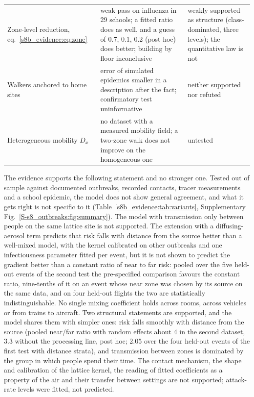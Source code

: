 \begin{table}[tbp]
\begin{tabular}{@{}>{\raggedright\arraybackslash}p{}>{\raggedright\arraybackslash}p{}>{\raggedright\arraybackslash}p{}@{}}
    Zone-level reduction, eq.~\eqref{s8b_evidence:eq:zone} &
      weak pass on influenza in 29 schools; a fitted ratio does as well, and a guess of 0.7, 0.1, 0.2 (post hoc)
      does better; building by floor inconclusive &
      weakly supported as structure (class-dominated, three levels); the quantitative law is not \\\addlinespace[2pt]
    Walkers anchored to home sites &
      error of simulated epidemics smaller in a description after the fact; confirmatory test uninformative &
      neither supported nor refuted \\\addlinespace[2pt]
    Heterogeneous mobility $D_x$ &
      no dataset with a measured mobility field; a two-zone walk does not improve on the homogeneous one &
      untested \\
    \bottomrule
  \end{tabular}
\end{table}

The evidence supports the following statement and no stronger one. Tested out of sample against documented
outbreaks, recorded contacts, tracer measurements and a school epidemic, the model does not show general
agreement, and what it gets right is not specific to it (Table~\ref{s8b_evidence:tab:variants},
Supplementary Fig.~\ref{S-s8_outbreaks:fig:summary}). The model with transmission only between people on the same lattice site is
not supported. The extension with a diffusing-aerosol term predicts that risk falls with distance from the source
better than a well-mixed model, with the kernel calibrated on other outbreaks and one infectiousness parameter
fitted per event, but it is not shown to predict the gradient better than a constant ratio of near to far risk:
pooled over the five held-out events of the second test the pre-specified comparison favours the constant ratio,
nine-tenths of it on an event whose near zone was chosen by its source on the same data, and on four held-out
flights the two are statistically indistinguishable. No single mixing coefficient holds across rooms, across
vehicles or from trains to aircraft. Two structural statements are supported, and the model shares them with
simpler ones: risk falls smoothly with distance from the source (pooled near/far ratio with random effects about 4
in the second dataset, 3.3 without the processing line, post hoc; 2.05 over the four held-out events of the first
test with distance strata), and transmission between zones is dominated by the group in which people spend their
time. The contact mechanism, the shape and calibration of the lattice kernel, the reading of fitted coefficients
as a property of the air and their transfer between settings are not supported; attack-rate levels were fitted,
not predicted.

